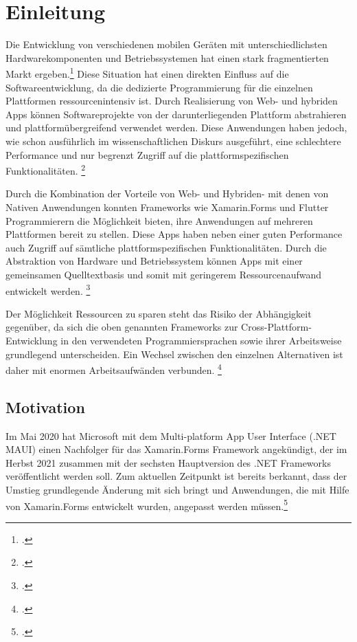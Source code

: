 \chapter{Einleitung}
Die Entwicklung von verschiedenen mobilen Geräten mit unterschiedlichsten Hardwarekomponenten und Betriebssystemen hat einen stark fragmentierten Markt ergeben.\footcite[Vgl.][S. 3]{Joorabchi2016}  Diese Situation hat einen direkten Einfluss auf die Softwareentwicklung, da die dedizierte Programmierung für die einzelnen Plattformen ressourcenintensiv ist.  Durch Realisierung von Web- und hybriden Apps können Softwareprojekte von der darunterliegenden Plattform abstrahieren und plattformübergreifend verwendet werden.  Diese Anwendungen haben jedoch, wie schon ausführlich im wissenschaftlichen Diskurs ausgeführt,  eine schlechtere Performance und nur begrenzt Zugriff auf die plattformspezifischen Funktionalitäten.  \footcite[Vgl.][S. 110ff.]{Barton2016} 

Durch die Kombination der Vorteile von Web- und Hybriden- mit denen von Nativen Anwendungen konnten Frameworks wie Xamarin.Forms und Flutter Programmierern die Möglichkeit bieten,  ihre Anwendungen auf mehreren Plattformen bereit zu stellen.  Diese Apps haben neben einer guten Performance auch Zugriff auf sämtliche plattformspezifischen Funktionalitäten.  Durch die Abstraktion von Hardware und Betriebssystem können Apps mit einer gemeinsamen Quelltextbasis und somit mit geringerem Ressourcenaufwand entwickelt werden. \footcite[Vgl.][S. 295]{Vollmer2017} 

Der Möglichkeit Ressourcen zu sparen steht das Risiko der Abhängigkeit gegenüber, da sich die oben genannten Frameworks zur Cross-Plattform-Entwicklung in den verwendeten Programmiersprachen sowie ihrer Arbeitsweise grundlegend unterscheiden.  Ein Wechsel zwischen den einzelnen Alternativen ist daher mit enormen Arbeitsaufwänden verbunden. \footcite[Vgl.][S. 64]{Wissel2017}  

\section{Motivation}
Im Mai 2020 hat Microsoft mit dem Multi-platform App User Interface (.NET MAUI) einen Nachfolger für das Xamarin.Forms Framework angekündigt, der im Herbst 2021 zusammen mit der sechsten Hauptversion des .NET Frameworks veröffentlicht werden soll. Zum aktuellen Zeitpunkt ist bereits berkannt, dass der Umstieg grundlegende Änderung mit sich bringt und Anwendungen,  die mit Hilfe von Xamarin.Forms entwickelt wurden,  angepasst werden müssen.\footcite[Vgl.][Abgerufen am 28.10.2020]{Hunter2020}

